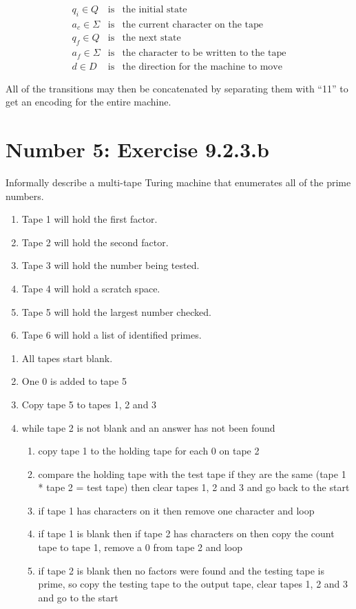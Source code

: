 \documentclass[12pt,a4paper,twoside]{article}  %
\begin{document}
\begin{eqnarray}
q_i \in Q &\textrm{is}& \textrm{the initial state} \\
a_c \in \Sigma &\textrm{is}& \textrm{the current character on the
  tape} \\
q_f \in Q &\textrm{is}& \textrm{the next state} \\
a_f \in \Sigma &\textrm{is}& \textrm{the character to be written to
  the tape} \\
d \in D &\textrm{is}& \textrm{the direction for the machine to move}
\end{eqnarray}

All of the transitions may then be concatenated by separating them
with ``11'' to get an encoding for the entire machine.

\section{Number 5: Exercise 9.2.3.b}

Informally describe a multi-tape Turing machine that enumerates all of
the prime numbers.\\

\begin{enumerate}
\item Tape 1 will hold the first factor.
\item Tape 2 will hold the second factor.
\item Tape 3 will hold the number being tested.
\item Tape 4 will hold a scratch space.
\item Tape 5 will hold the largest number checked.
\item Tape 6 will hold a list of identified primes.
\end{enumerate}

\begin{enumerate}
\item All tapes start blank.
\item One 0 is added to tape 5
\item Copy tape 5 to tapes 1, 2 and 3
\item while tape 2 is not blank and an answer has not been found
\begin{enumerate}
\item copy tape 1 to the holding tape for each 0 on tape 2
\item compare the holding tape with the test tape if they are the same
 (tape 1 * tape 2 = test tape) then clear tapes 1, 2 and 3 and go back
 to the start
\item if tape 1 has characters on it then remove one character and
  loop
\item if tape 1 is blank then if tape 2 has characters on then copy
  the count tape to tape 1, remove a 0 from tape 2 and loop
\item if tape 2 is blank then no factors were found and the testing
  tape is prime, so copy the testing tape to the output tape, clear
  tapes 1, 2 and 3 and go to the start
\end{enumerate}
\end{enumerate}
\end{document}
